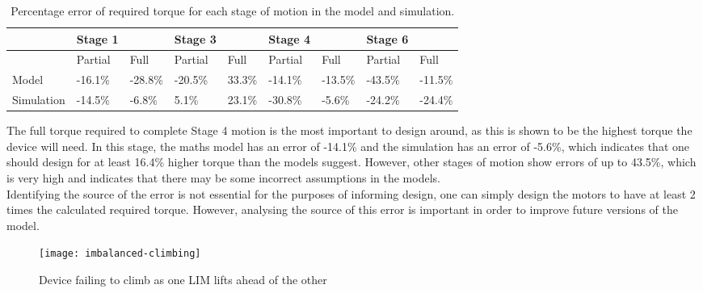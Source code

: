  

\begin{table}[!ht]
	\centering
	\caption{Percentage error of required torque for each stage of motion in the model and simulation.}
	\label{tab:error}
	\begin{tabular}{|l|l|l|l|l|l|l|l|l|}
		\hline
		~ & Stage 1 & ~ & Stage 3 & ~ & Stage 4 & ~ & Stage 6 & ~ \\ \hline
		~ & Partial & Full & Partial & Full & Partial & Full & Partial & Full \\ \hline
		Model & -16.1\% & -28.8\% & -20.5\% & 33.3\% & -14.1\% & -13.5\% & -43.5\% & -11.5\% \\ \hline
		Simulation & -14.5\% & -6.8\% & 5.1\% & 23.1\% & -30.8\% & -5.6\% & -24.2\% & -24.4\% \\ \hline
	\end{tabular}
\end{table}

The full torque required to complete Stage 4 motion is the most important to design around, as this is shown to be the highest torque the device will need. In this stage, the maths model has an error of -14.1\% and the simulation has an error of -5.6\%, which indicates that one should design for at least 16.4\% higher torque than the models suggest. However, other stages of motion show errors of up to 43.5\%, which is very high and indicates that there may be some incorrect assumptions in the models.\\

Identifying the source of the error is not essential for the purposes of informing design, one can simply design the motors to have at least 2 times the calculated required torque. However, analysing the source of this error is important in order to improve future versions of the model.\\

\begin{wrapfigure}{r}{0.35\textwidth}
	\centering
	\texttt{[image: imbalanced-climbing]}
	\caption{Device failing to climb as one LIM lifts ahead of the other}
	\label{fig:imbalanced-climbing}
\end{wrapfigure}

